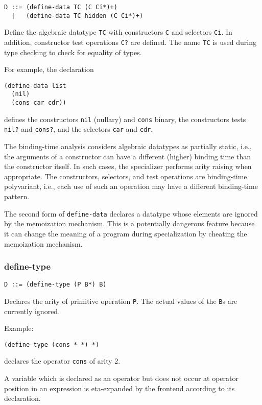 \documentclass[11pt]{article}
\makeatletter
\newcommand{\dindextt}[1]{\index{#1@\texttt{#1}|textbf}}
\makeatother
\begin{document}
\begin{verbatim}
D ::= (define-data TC (C Ci*)+)
  |   (define-data TC hidden (C Ci*)+)
\end{verbatim}
Define the algebraic datatype \texttt{TC} with constructors \texttt{C}
and selectors \texttt{Ci}. In addition, constructor test operations \texttt{C?}
are defined. The name \texttt{TC} is used during type checking to
check for equality of types.

For example, the declaration
\begin{verbatim}
(define-data list
  (nil)
  (cons car cdr))
\end{verbatim}
defines the constructors \texttt{nil} (nullary) and \texttt{cons}
binary, the constructors tests \texttt{nil?} and \texttt{cons?}, and
the selectors \texttt{car} and \texttt{cdr}.

The binding-time analysis considers algebraic datatypes as partially
static, i.e., the arguments of a constructor can have a different
(higher) binding time than the constructor itself. In such cases, the
specializer performs arity raising when appropriate. The constructors,
selectors, and test operations are binding-time polyvariant, i.e.,
each use of such an operation may have a different binding-time
pattern.  

The second form of \texttt{define-data} declares a datatype whose elements are
ignored by the memoization mechanism. This is a potentially dangerous  
feature because it can change the meaning of a program during specialization by
cheating the memoization mechanism.

\subsubsection{define-type}
\dindextt{define-type}
\begin{verbatim}
D ::= (define-type (P B*) B)
\end{verbatim}
Declares the arity of primitive operation \texttt{P}. The actual
values of the \texttt{B}s are currently ignored.

Example:
\begin{verbatim}
(define-type (cons * *) *)
\end{verbatim}
declares the operator \texttt{cons} of arity 2.

A variable which is declared as an
operator but does not occur at operator position in an expression
is eta-expanded by the frontend according to its declaration.
\end{document}
